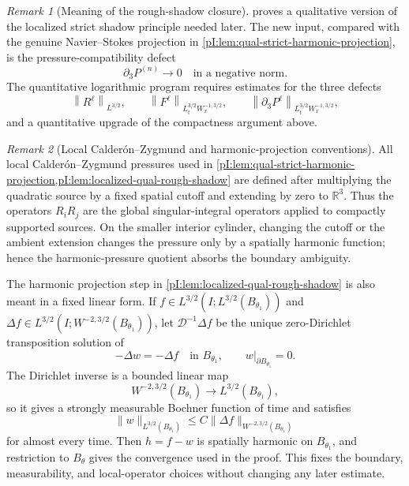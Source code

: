 \documentclass[11pt]{article}
\numberwithin{equation}{section}
\theoremstyle{plain}
\theoremstyle{definition}
\theoremstyle{remark}
\newtheorem{remark}{Remark}[section]
\newcommand{\R}{\mathbb R}
\newcommand{\norm}[2]{\left\|#1\right\|_{#2}}
\begin{document}
\begin{remark}[Meaning of the rough-shadow closure]
 proves a qualitative version of the localized strict shadow principle needed later.  The new input, compared with the genuine Navier--Stokes projection in \cref{pI:lem:qual-strict-harmonic-projection}, is the pressure-compatibility defect
\[
        \partial_3P^{(n)}\to0
        \quad\text{in a negative norm}.
\]
The quantitative logarithmic program requires estimates for the three defects
\[
        \norm{R^\ell}{L^{3/2}},
        \qquad
        \norm{F^\ell}{L^{3/2}_tW^{-1,3/2}_x},
        \qquad
        \norm{\partial_3P^\ell}{L^{3/2}_tW^{-1,3/2}_x},
\]
and a quantitative upgrade of the compactness argument above.
\end{remark}


\begin{remark}[Local Calder\'on--Zygmund and harmonic-projection conventions]\label{pI:rem:local-CZ-harmonic-projection}
All local Calder\'on--Zygmund pressures used in \cref{pI:lem:qual-strict-harmonic-projection,pI:lem:localized-qual-rough-shadow} are defined after multiplying the quadratic source by a fixed spatial cutoff and extending by zero to \(\R^3\).  Thus the operators \(R_iR_j\) are the global singular-integral operators applied to compactly supported sources.  On the smaller interior cylinder, changing the cutoff or the ambient extension changes the pressure only by a spatially harmonic function; hence the harmonic-pressure quotient absorbs the boundary ambiguity.

The harmonic projection step in \cref{pI:lem:localized-qual-rough-shadow} is also meant in a fixed linear form.  If \(f\in L^{3/2}(I;L^{3/2}(B_{\theta_1}))\) and \(\Delta f\in L^{3/2}(I;W^{-2,3/2}(B_{\theta_1}))\), let \(\mathcal D^{-1}\Delta f\) be the unique zero-Dirichlet transposition solution of
\[
        -\Delta w=-\Delta f\quad\text{in }B_{\theta_1},
        \qquad w|_{\partial B_{\theta_1}}=0.
\]
The Dirichlet inverse is a bounded linear map
\[
        W^{-2,3/2}(B_{\theta_1})\longrightarrow L^{3/2}(B_{\theta_1}),
\]
so it gives a strongly measurable Bochner function of time and satisfies
\[
        \|w\|_{L^{3/2}(B_{\theta_1})}
        \le C\|\Delta f\|_{W^{-2,3/2}(B_{\theta_1})}
\]
for almost every time.  Then \(h=f-w\) is spatially harmonic on \(B_{\theta_1}\), and restriction to \(B_\theta\) gives the convergence used in the proof.  This fixes the boundary, measurability, and local-operator choices without changing any later estimate.
\end{remark}
\end{document}
